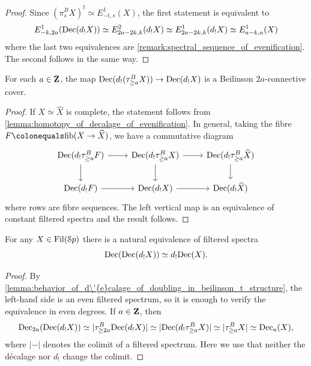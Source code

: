 \documentclass[oneside,a4paper]{amsart}
\begin{document}
\begin{proof}
Since $(\pi_{s}^{B} X)^{t} \simeq E^{1}_{-t, s}(X)$, the first statement is equivalent to
\[
E^{1}_{-k, 2a}(\mathrm{Dec}(d_{!}X)) \simeq E^{2}_{2a-2k, k}(d_{!}X) \simeq E^{1}_{2a-2k, k}(d_{!}X) \simeq E^{1}_{a-k, a}(X)
\]
where the last two equivalences are \cref{remark:spectral_sequence_of_evenification}. The second follows in the same way. 
\end{proof}

\begin{lemma}
\label{lemma:behavior_of_d\'{e}calage_of_doubling_in_beilinson_t_structure}
For each $a \in \mathbf{Z}$, the map $\mathrm{Dec}(d_{!}(\tau_{\geq a}^{B} X)) \rightarrow \mathrm{Dec}(d_{!}X)$ is a Beilinson $2a$-connective cover. 
\end{lemma}

\begin{proof}
If $X \simeq \widehat{X}$ is complete, the statement follows from \cref{lemma:homotopy_of_decalage_of_evenification}. In general, taking the fibre $F \colonequals \mathrm{fib}(X \rightarrow \widehat{X})$, we have a commutative diagram 
\[
\begin{tikzcd}
	{\Dec(d_{!}\tau_{\geq a}^{B}F)} & {\Dec(d_{!}\tau_{\geq a}^{B}X)} & {\Dec(d_{!}\tau_{\geq a}^{B} \widehat{X})} \\
	{\Dec(d_{!}F)} & {\Dec(d_{!}X)} & {\Dec(d_{!}\widehat{X})}
	\arrow[from=1-1, to=1-2]
	\arrow[from=1-1, to=2-1]
	\arrow[from=1-2, to=1-3]
	\arrow[from=1-2, to=2-2]
	\arrow[from=1-3, to=2-3]
	\arrow[from=2-1, to=2-2]
	\arrow[from=2-2, to=2-3]
\end{tikzcd}
\]
where rows are fibre sequences. The left vertical map is an equivalence of constant filtered spectra and the result follows. 
\end{proof}

\begin{proposition}
\label{proposition:decalage_and_doubling_interaction}
For any $X \in \operatorname{Fil}(\EuScript{S}p)$ there is a natural equivalence of filtered spectra 
\[
\mathrm{Dec}(\mathrm{Dec}(d_{!}X)) \simeq d_{!} \mathrm{Dec}(X). 
\]
\end{proposition}

\begin{proof}
By \cref{lemma:behavior_of_d\'{e}calage_of_doubling_in_beilinson_t_structure}, the left-hand side is an even filtered spectrum, so it is enough to verify the equivalence in even degrees. If $a \in \mathbf{Z}$, then 
\[
\mathrm{Dec}_{2a}(\mathrm{Dec}(d_{!}X)) \simeq | \tau_{\geq 2a}^{B} \mathrm{Dec}(d_{!} X) | \simeq | \mathrm{Dec}(d_{!} \tau_{\geq a}^{B} X) | \simeq | \tau_{\geq a}^{B} X | \simeq \mathrm{Dec}_{a}(X),
\]
where $|-|$ denotes the colimit of a filtered spectrum. Here we use that neither the d\'{e}calage nor $d_{!}$ change the colimit. 
\end{proof}
\end{document}
